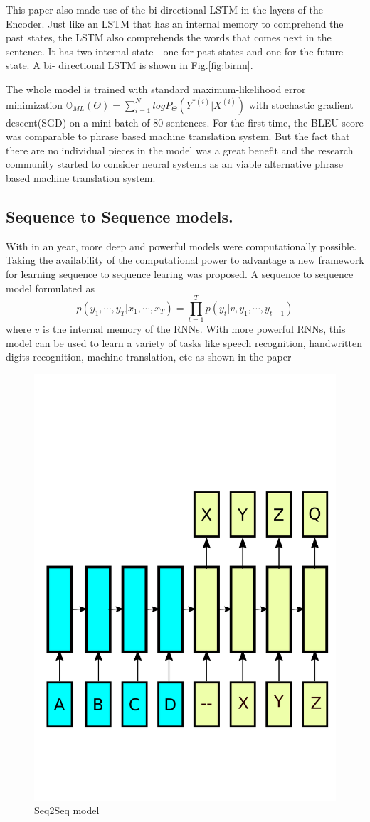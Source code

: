 \documentclass[a4paper]{article}
\begin{document}
This paper  also made  use of  the  bi-directional  LSTM  in  the layers  of the
Encoder. Just like  an  LSTM that has an internal memory to comprehend  the past
states, the LSTM also comprehends the words that comes next in the sentence.  It
has two internal state---one for past states and one for the future state. A bi-
directional LSTM is shown in Fig.\ref{fig:birnn}.

The whole model is trained with standard maximum-likelihood  error  minimization
$\mathbb{O}_{ML}(\Theta) = \sum_{i=1}^N log P_\Theta(Y^{*(i)} |  X^{(i)}) $ with
stochastic gradient  descent(SGD) on a mini-batch of 80 sentences. For the first
time, the BLEU score was comparable to phrase based machine  translation system.
But  the fact  that there  are  no  individual pieces  in the  model was a great
benefit and the  research  community started to  consider  neural systems as  an
viable alternative phrase based machine translation system.


\subsection{Sequence  to Sequence models.}
\label{sec:seq}  With  in  an  year,  more   deep   and   powerful  models  were
computationally possible. Taking the availability of the computational power  to
advantage  a  new  framework  for  learning  sequence  to sequence  learing was
proposed. A sequence to sequence model formulated as $$ p(y_1, \cdots, y_T| x_1,
\cdots, x_T) =  \prod_{t=1}^{T} p(y_t| v, y_1,  \cdots,  y_{t-1})$$ where $v$ is
the internal memory of the RNNs. With more powerful RNNs, this model can be used
to  learn a  variety  of  tasks  like  speech  recognition,  handwritten  digits
recognition,   machine   translation,    etc    as   shown    in    the    paper
\cite{sutskever2014sequence}


\begin{figure}
  \centering
  \includegraphics[width=.49\linewidth]{img/seq2seq.pdf}
  \caption{ Seq2Seq model}
  \label{fig:seq}
\end{figure}
\end{document}

